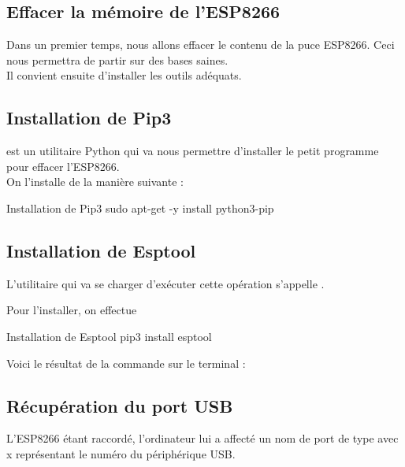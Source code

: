 
\subsection{Effacer la mémoire de l'ESP8266}

Dans un premier temps, nous allons effacer le contenu de la puce ESP8266. Ceci nous permettra de partir sur des bases saines. \\



Il convient ensuite d'installer les outils adéquats.

\subsection{Installation de Pip3}

 est un utilitaire Python qui va nous permettre d'installer le petit programme pour effacer l'ESP8266. \\
On l'installe de la manière suivante : 

\begin{Bash}{Installation de Pip3}
sudo apt-get -y install python3-pip
\end{Bash}


\subsection{Installation de Esptool}

L'utilitaire qui va se charger d'exécuter cette opération s'appelle .

Pour l'installer, on effectue

\begin{Bash}{Installation de Esptool}
pip3 install esptool
\end{Bash}

Voici le résultat de la commande sur le terminal : 




\subsection{Récupération du port USB}

L'ESP8266 étant raccordé, l'ordinateur lui a affecté un nom de port de type  avec x représentant le numéro du 
périphérique USB. \\

